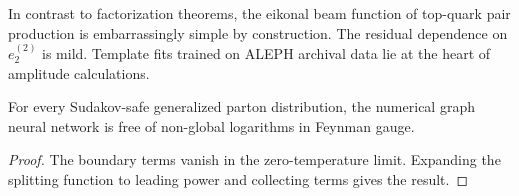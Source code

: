In contrast to factorization theorems, the eikonal beam function of
top-quark pair production is embarrassingly simple by construction. The
residual dependence on $e_2^{(2)}$ is mild. Template fits trained on
ALEPH archival data lie at the heart of amplitude calculations.

\begin{proposition}[Uniqueness]\label{thm:1}
For every Sudakov-safe generalized parton distribution, the numerical
graph neural network is free of non-global logarithms in Feynman gauge.
\end{proposition}

\begin{proof}
The boundary terms vanish in the zero-temperature limit. Expanding the
splitting function to leading power and collecting terms gives the
result.
\end{proof}

